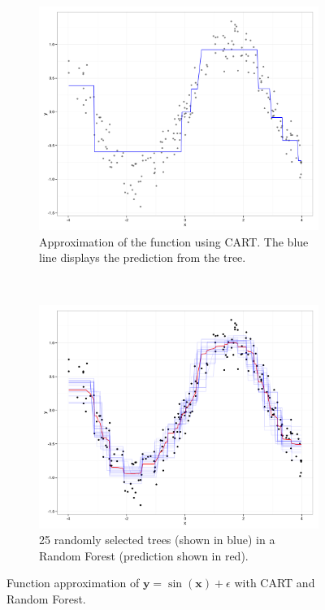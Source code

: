 \begin{figure}
        \centering
        \begin{subfigure}[b]{0.5\textwidth}
                \includegraphics[width=\textwidth]{figures/cart_approximation.png}
                \caption{Approximation of the function using CART. The blue line displays the prediction from the tree.}
                \label{fig:cart_approx}
        \end{subfigure}%
        ~ %
        \begin{subfigure}[b]{0.5\textwidth}
                \includegraphics[width=\textwidth]{figures/forest_approximation.png}
                \caption{25 randomly selected trees (shown in blue) in a Random Forest (prediction shown in red).}
                \label{fig:rf_approx}
        \end{subfigure}
        \caption{Function approximation of  $\mathbf{y} = \sin(\mathbf{x}) + \epsilon$  with CART and Random Forest.}
        \label{fig:interaction}
\end{figure}
